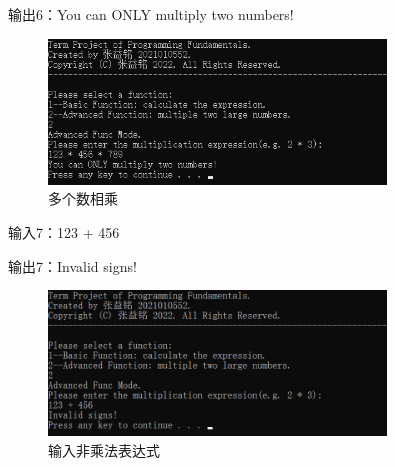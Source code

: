 \documentclass[a4paper, 11pt, UTF8]{ctexart}
\begin{document}
输出6：You can ONLY multiply two numbers!

\begin{figure}[H]
    \centering
    \caption{多个数相乘}
    \includegraphics[width=0.8\textwidth]{t6.png}    
\end{figure}

输入7：123 + 456

输出7：Invalid signs!

\begin{figure}[H]
    \centering
    \caption{输入非乘法表达式}
    \includegraphics[width=0.8\textwidth]{t7.png}    
\end{figure}
\end{document}
